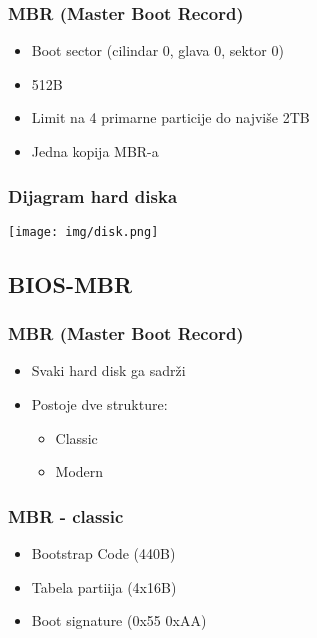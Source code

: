 \documentclass{beamer}
\begin{document}
\begin{frame}
    \frametitle{MBR (Master Boot Record)}
    \begin{itemize}
        \item Boot sector (cilindar 0, glava 0, sektor 0) \newline
        \item 512B \newline
        \item Limit na 4 primarne particije do najviše 2TB \newline
        \item Jedna kopija MBR-a \newline
    \end{itemize}
\end{frame}

\begin{frame}
    \frametitle{Dijagram hard diska}
    \begin{center}
        \texttt{[image: img/disk.png]}
    \end{center}
\end{frame}

\subsection*{BIOS-MBR}
\begin{frame}
    \frametitle{MBR (Master Boot Record)}
    \begin{itemize}
        \item Svaki hard disk ga sadrži \newline
        \item Postoje dve strukture: \begin{itemize}
            \item Classic \newline
            \item Modern 
        \end{itemize}
    \end{itemize}
\end{frame}

\begin{frame}
    
    \frametitle{MBR - classic}
    \begin{itemize}
        \item Bootstrap Code (440B) \newline
        \item Tabela partiija (4x16B) \newline
        \item Boot signature (0x55 0xAA) \newline 
    \end{itemize}
\end{frame}
\end{document}
